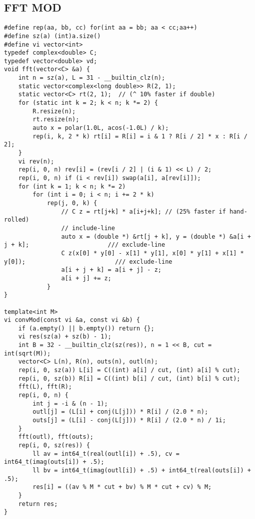 \documentclass{article}
\begin{document}
\subsection{FFT MOD}
\begin{verbatim}
#define rep(aa, bb, cc) for(int aa = bb; aa < cc;aa++)
#define sz(a) (int)a.size()
#define vi vector<int>
typedef complex<double> C;
typedef vector<double> vd;
void fft(vector<C> &a) {
    int n = sz(a), L = 31 - __builtin_clz(n);
    static vector<complex<long double>> R(2, 1);
    static vector<C> rt(2, 1);  // (^ 10% faster if double)
    for (static int k = 2; k < n; k *= 2) {
        R.resize(n);
        rt.resize(n);
        auto x = polar(1.0L, acos(-1.0L) / k);
        rep(i, k, 2 * k) rt[i] = R[i] = i & 1 ? R[i / 2] * x : R[i / 2];
    }
    vi rev(n);
    rep(i, 0, n) rev[i] = (rev[i / 2] | (i & 1) << L) / 2;
    rep(i, 0, n) if (i < rev[i]) swap(a[i], a[rev[i]]);
    for (int k = 1; k < n; k *= 2)
        for (int i = 0; i < n; i += 2 * k)
            rep(j, 0, k) {
                // C z = rt[j+k] * a[i+j+k]; // (25% faster if hand-rolled)  
                // include-line
                auto x = (double *) &rt[j + k], y = (double *) &a[i + j + k];                      /// exclude-line
                C z(x[0] * y[0] - x[1] * y[1], x[0] * y[1] + x[1] * y[0]);                         /// exclude-line
                a[i + j + k] = a[i + j] - z;
                a[i + j] += z;
            }
}

template<int M>
vi convMod(const vi &a, const vi &b) {
    if (a.empty() || b.empty()) return {};
    vi res(sz(a) + sz(b) - 1);
    int B = 32 - __builtin_clz(sz(res)), n = 1 << B, cut = int(sqrt(M));
    vector<C> L(n), R(n), outs(n), outl(n);
    rep(i, 0, sz(a)) L[i] = C((int) a[i] / cut, (int) a[i] % cut);
    rep(i, 0, sz(b)) R[i] = C((int) b[i] / cut, (int) b[i] % cut);
    fft(L), fft(R);
    rep(i, 0, n) {
        int j = -i & (n - 1);
        outl[j] = (L[i] + conj(L[j])) * R[i] / (2.0 * n);
        outs[j] = (L[i] - conj(L[j])) * R[i] / (2.0 * n) / 1i;
    }
    fft(outl), fft(outs);
    rep(i, 0, sz(res)) {
        ll av = int64_t(real(outl[i]) + .5), cv = int64_t(imag(outs[i]) + .5);
        ll bv = int64_t(imag(outl[i]) + .5) + int64_t(real(outs[i]) + .5);
        res[i] = ((av % M * cut + bv) % M * cut + cv) % M;
    }
    return res;
}
\end{verbatim}
\end{document}
